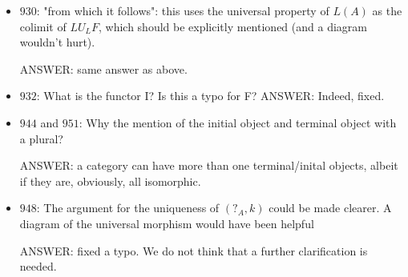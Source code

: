 \documentclass[english,11pt,a4paper]{article}
\begin{document}
\begin{itemize}
\item $930$: "from which it follows": this uses the universal property of $L(A)$ as the colimit of $LU_LF$, which should be explicitly mentioned (and a diagram wouldn't hurt).

ANSWER: same answer as above.

\item $932$: What is the functor I? Is this a typo for F?
ANSWER: Indeed, fixed.

\item $944$ and $951$: Why the mention of the initial object and terminal object with a plural?

ANSWER: a category can have more than one terminal/inital objects, albeit if they are, obviously, all isomorphic.

\item $948$: The argument for the uniqueness of $(?_A,k)$ could be made clearer. A diagram of the universal morphism would have been helpful

ANSWER: fixed a typo. We do not think that a further clarification is needed.


 \end{itemize}
\end{document}

